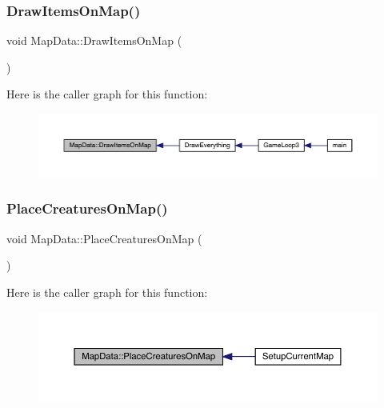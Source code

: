 \subsubsection{\texorpdfstring{Draw\+Items\+On\+Map()}{DrawItemsOnMap()}}
{\footnotesize\ttfamily void Map\+Data\+::\+Draw\+Items\+On\+Map (\begin{DoxyParamCaption}{ }\end{DoxyParamCaption})}

Here is the caller graph for this function\+:
\nopagebreak
\begin{figure}[H]
\begin{center}
\leavevmode
\includegraphics[width=350pt]{class_map_data_abfdefc2bef87a02d3d83176ad6ba7832_icgraph}
\end{center}
\end{figure}
\mbox{\label{class_map_data_ad377a46f779bfcb9ac57dcdd3a969eca}} 
\subsubsection{\texorpdfstring{Place\+Creatures\+On\+Map()}{PlaceCreaturesOnMap()}}
{\footnotesize\ttfamily void Map\+Data\+::\+Place\+Creatures\+On\+Map (\begin{DoxyParamCaption}{ }\end{DoxyParamCaption})}

Here is the caller graph for this function\+:
\nopagebreak
\begin{figure}[H]
\begin{center}
\leavevmode
\includegraphics[width=350pt]{class_map_data_ad377a46f779bfcb9ac57dcdd3a969eca_icgraph}
\end{center}
\end{figure}
\mbox{\label{class_map_data_aae575fa856f1d179220c4781873fd635}} 
